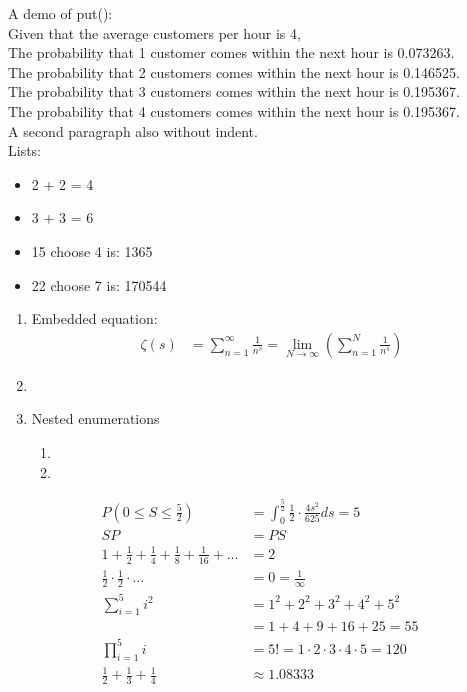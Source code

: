 \documentclass[11pt]{article}
\begin{document}
    
        \noindent
        A demo of put(): \\
        Given that the average customers per hour is 4, \\
        The probability that 1 customer comes within the next hour is 0.073263. \\
        The probability that 2 customers comes within the next hour is 0.146525. \\
        The probability that 3 customers comes within the next hour is 0.195367. \\
        The probability that 4 customers comes within the next hour is 0.195367. \\
        
        \noindent
        A second paragraph also without indent. \\
    
    Lists:
    \begin{itemize}
        \item  2 + 2 = 4
        \item  3 + 3 = 6
        \item  15 choose 4 is: 1365

        \item  22 choose 7 is: 170544
    \end{itemize}
    
    \begin{enumerate}
        \item  \lipsum[1]
            Embedded equation:
            \begin{align*}\zeta(s) &= \sum_{n = 1}^{\infty} \frac{1}{{n^s}} = \lim_{N \to \infty} \left(\sum_{n = 1}^{N} \frac{1}{{n^s}}\right)
            \end{align*}
            
        \item  \lipsum[2]
        \item  Nested enumerations
        \begin{enumerate}%
            \item  \lipsum[3]
            \item  \lipsum[4]
        \end{enumerate}
    \end{enumerate}
    
    \begin{align*}
        P(0 \leq S \leq \frac{5}{2}) &= \int_{0}^{\frac{5}{2}} \frac{1}{2} \cdot \frac{{4s^2}}{625} ds = 5 \\
        SP &= PS \\
        1 + \frac{1}{2}+\frac{1}{4}+\frac{1}{8}+\frac{1}{16} + \hdots &= 2 \\
        \frac{1}{2} \cdot \frac{1}{2} \cdot \hdots &= 0 = \frac{1}{\infty} \\
        \sum_{i = 1}^{5} i^2 &= 1^2+2^2+3^2+4^2+5^2 \\
        &= 1+4+9+16+25 = 55 \\
        \prod_{i = 1}^{5} i &= 5! = 1 \cdot 2 \cdot 3 \cdot 4 \cdot 5 = 120 \\
        \frac{1}{2} + \frac{1}{3} + \frac{1}{4} &\approx 1.08333
    \end{align*}
    
\end{document}
